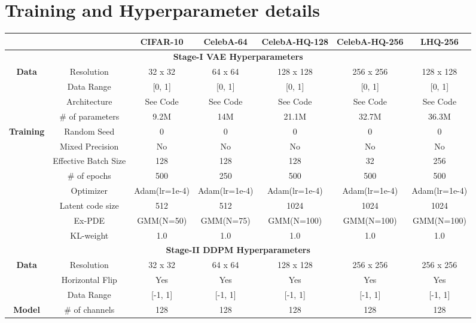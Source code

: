 \documentclass[10pt]{article} \usepackage[accepted]{tmlr}
\begin{document}
\section{Training and Hyperparameter details}
\label{sec:appendix_e}
\begin{table}[t]
\tiny
\centering
\begin{tabular}{@{}ccccccc@{}}
\toprule
 &  & \textbf{CIFAR-10} & \textbf{CelebA-64} & \textbf{CelebA-HQ-128} & \textbf{CelebA-HQ-256} & \textbf{LHQ-256}\\ \midrule
\multicolumn{7}{c}{\textbf{Stage-I VAE Hyperparameters}} \\ \midrule
\multirow{3}{*}{\textbf{Data}} & Resolution & 32 x 32 & 64 x 64 & 128 x 128 & 256 x 256 & 128 x 128 \\
 & Data Range & {[}0, 1{]} & {[}0, 1{]} & {[}0, 1{]} & {[}0, 1{]} & {[}0, 1{]}\\ \midrule
\multirow{2}{*}{\textbf{Model}} & Architecture & See Code & See Code & See Code & See Code & See Code \\
 & \# of parameters & 9.2M & 14M & 21.1M & 32.7M & 36.3M\\ \midrule
\multirow{8}{*}{\textbf{Training}} & Random Seed & 0 & 0 & 0 & 0 & 0\\
 & Mixed Precision & No & No & No & No & No \\
 & Effective Batch Size & 128 & 128 & 128 & 32 & 256 \\
 & \# of epochs & 500 & 250 & 500 & 500 & 500 \\
 & Optimizer & Adam(lr=1e-4) & Adam(lr=1e-4) & Adam(lr=1e-4) & Adam(lr=1e-4) & Adam(lr=1e-4) \\
 & Latent code size & 512 & 512 & 1024 & 1024 & 1024 \\
 & Ex-PDE & GMM(N=50) & GMM(N=75) & GMM(N=100) & GMM(N=100) & GMM(N=100) \\
 & KL-weight & 1.0 & 1.0 & 1.0 & 1.0 & 1.0 \\ \midrule
\multicolumn{7}{c}{\textbf{Stage-II DDPM Hyperparameters}} \\ \midrule
\multirow{3}{*}{\textbf{Data}} & Resolution & 32 x 32 & 64 x 64 & 128 x 128 & 256 x 256 & 256 x 256 \\
 & Horizontal Flip & Yes & Yes & Yes & Yes & Yes \\
 & Data Range & {[}-1, 1{]} & {[}-1, 1{]} & {[}-1, 1{]} & {[}-1, 1{]} & {[}-1, 1{]} \\ \midrule
\multirow{9}{*}{\textbf{Model}} & \# of channels & 128 & 128 & 128 & 128 & 128 \\

\end{tabular}
\end{table}
\end{document}
